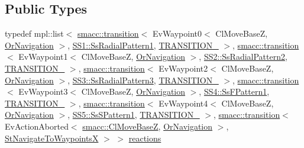 \subsection*{Public Types}
\begin{DoxyCompactItemize}
\item 
typedef mpl\+::list$<$ \hyperlink{classsmacc_1_1transition}{smacc\+::transition}$<$ Ev\+Waypoint0$<$ Cl\+Move\+BaseZ, \hyperlink{classsm__dance__bot_1_1OrNavigation}{Or\+Navigation} $>$, \hyperlink{structsm__dance__bot_1_1SS1_1_1SsRadialPattern1}{S\+S1\+::\+Ss\+Radial\+Pattern1}, \hyperlink{structsm__dance__bot_1_1StNavigateToWaypointsX_1_1TRANSITION__1}{T\+R\+A\+N\+S\+I\+T\+I\+O\+N\+\_} $>$, \hyperlink{classsmacc_1_1transition}{smacc\+::transition}$<$ Ev\+Waypoint1$<$ Cl\+Move\+BaseZ, \hyperlink{classsm__dance__bot_1_1OrNavigation}{Or\+Navigation} $>$, \hyperlink{structsm__dance__bot_1_1SS2_1_1SsRadialPattern2}{S\+S2\+::\+Ss\+Radial\+Pattern2}, \hyperlink{structsm__dance__bot_1_1StNavigateToWaypointsX_1_1TRANSITION__2}{T\+R\+A\+N\+S\+I\+T\+I\+O\+N\+\_} $>$, \hyperlink{classsmacc_1_1transition}{smacc\+::transition}$<$ Ev\+Waypoint2$<$ Cl\+Move\+BaseZ, \hyperlink{classsm__dance__bot_1_1OrNavigation}{Or\+Navigation} $>$, \hyperlink{structsm__dance__bot_1_1SS3_1_1SsRadialPattern3}{S\+S3\+::\+Ss\+Radial\+Pattern3}, \hyperlink{structsm__dance__bot_1_1StNavigateToWaypointsX_1_1TRANSITION__3}{T\+R\+A\+N\+S\+I\+T\+I\+O\+N\+\_} $>$, \hyperlink{classsmacc_1_1transition}{smacc\+::transition}$<$ Ev\+Waypoint3$<$ Cl\+Move\+BaseZ, \hyperlink{classsm__dance__bot_1_1OrNavigation}{Or\+Navigation} $>$, \hyperlink{structsm__dance__bot_1_1SS4_1_1SsFPattern1}{S\+S4\+::\+Ss\+F\+Pattern1}, \hyperlink{structsm__dance__bot_1_1StNavigateToWaypointsX_1_1TRANSITION__4}{T\+R\+A\+N\+S\+I\+T\+I\+O\+N\+\_} $>$, \hyperlink{classsmacc_1_1transition}{smacc\+::transition}$<$ Ev\+Waypoint4$<$ Cl\+Move\+BaseZ, \hyperlink{classsm__dance__bot_1_1OrNavigation}{Or\+Navigation} $>$, \hyperlink{structsm__dance__bot_1_1SS5_1_1SsSPattern1}{S\+S5\+::\+Ss\+S\+Pattern1}, \hyperlink{structsm__dance__bot_1_1StNavigateToWaypointsX_1_1TRANSITION__5}{T\+R\+A\+N\+S\+I\+T\+I\+O\+N\+\_} $>$, \hyperlink{classsmacc_1_1transition}{smacc\+::transition}$<$ Ev\+Action\+Aborted$<$ \hyperlink{classsmacc_1_1ClMoveBaseZ}{smacc\+::\+Cl\+Move\+BaseZ}, \hyperlink{classsm__dance__bot_1_1OrNavigation}{Or\+Navigation} $>$, \hyperlink{structsm__dance__bot_1_1StNavigateToWaypointsX}{St\+Navigate\+To\+WaypointsX} $>$ $>$ \hyperlink{structsm__dance__bot_1_1StNavigateToWaypointsX_acc3c2f47741d22e863486a15b16d7c87}{reactions}
\end{DoxyCompactItemize}
